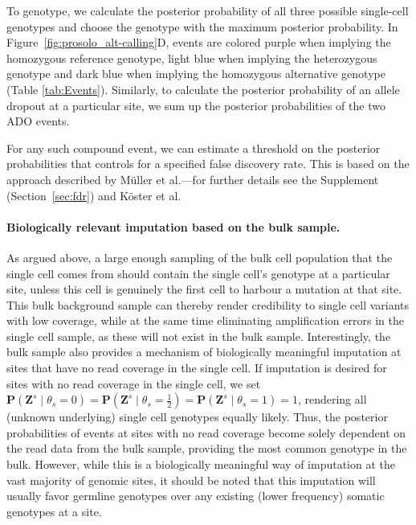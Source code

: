 \documentclass[12pt,inline]{wlscirep}
\newcommand{\Prob}{{\mathbf{P}}}
\begin{document}
To genotype, we calculate the posterior probability of all three possible single-cell genotypes and choose the genotype with the maximum posterior probability. 
In Figure~\ref{fig:prosolo_alt-calling}D, events are colored purple when implying the homozygous reference genotype, light blue when implying the heterozygous genotype and dark blue when implying the homozygous alternative genotype (Table \ref{tab:Events}).
Similarly, to calculate the posterior probability of an allele dropout at a particular site, we sum up the posterior probabilities of the two {\ttfamily ADO} events.

For any such compound event, we can estimate a threshold on the posterior probabilities that controls for a specified false discovery rate. 
This is based on the approach described by Müller et al.\cite{muller_optimal_2004,muller_fdr_2006}---for further details see the Supplement (Section~\ref{sec:fdr}) and Köster et al\cite{koster_varlociraptor_2020}.

\paragraph{Biologically relevant imputation based on the bulk sample.}
As argued above, a large enough sampling of the bulk cell population that the single cell comes from should contain the single cell's genotype at a particular site, unless this cell is genuinely the first cell to harbour a mutation at that site.
This bulk background sample can thereby render credibility to single cell variants with low coverage, while at the same time eliminating amplification errors in the single cell sample, as these will not exist in the bulk sample.
Interestingly, the bulk sample also provides a mechanism of biologically meaningful imputation at sites that have no read coverage in the single cell.
If imputation is desired for sites with no read coverage in the single cell, we set $\Prob(\boldsymbol{Z}^s \mid \theta_s = 0) = \Prob(\boldsymbol{Z}^s \mid \theta_s = \frac{1}{2}) = \Prob(\boldsymbol{Z}^s \mid \theta_s = 1) = 1$, rendering all (unknown underlying) single cell genotypes equally likely.
Thus, the posterior probabilities of events at sites with no read coverage become solely dependent on the read data from the bulk sample, providing the most common genotype in the bulk.
However, while this is a biologically meaningful way of imputation at the vast majority of genomic sites, it should be noted that this imputation will usually favor germline genotypes over any existing (lower frequency) somatic genotypes at a site.
\end{document}

